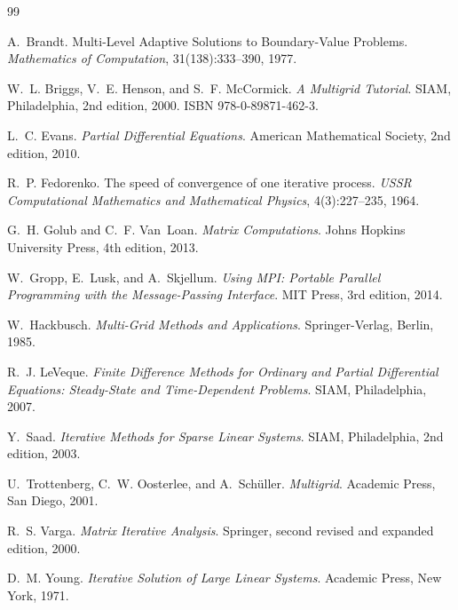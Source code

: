 \documentclass[11pt]{article}
\theoremstyle{definition}
\begin{document}
\begin{thebibliography}{99}

A.~Brandt.
\newblock Multi-Level Adaptive Solutions to Boundary-Value Problems.
\newblock \emph{Mathematics of Computation}, 31(138):333--390, 1977.

W.~L. Briggs, V.~E. Henson, and S.~F. McCormick.
\newblock \emph{A Multigrid Tutorial}.
\newblock SIAM, Philadelphia, 2nd edition, 2000.
\newblock ISBN 978-0-89871-462-3.

L.~C. Evans.
\newblock \emph{Partial Differential Equations}.
\newblock American Mathematical Society, 2nd edition, 2010.

R.~P. Fedorenko.
\newblock The speed of convergence of one iterative process.
\newblock \emph{USSR Computational Mathematics and Mathematical Physics},
  4(3):227--235, 1964.

G.~H. Golub and C.~F. Van~Loan.
\newblock \emph{Matrix Computations}.
\newblock Johns Hopkins University Press, 4th edition, 2013.

W.~Gropp, E.~Lusk, and A.~Skjellum.
\newblock \emph{Using MPI: Portable Parallel Programming with the
  Message-Passing Interface}.
\newblock MIT Press, 3rd edition, 2014.

W.~Hackbusch.
\newblock \emph{Multi-Grid Methods and Applications}.
\newblock Springer-Verlag, Berlin, 1985.

R.~J. LeVeque.
\newblock \emph{Finite Difference Methods for Ordinary and Partial
  Differential Equations: Steady-State and Time-Dependent Problems}.
\newblock SIAM, Philadelphia, 2007.

Y.~Saad.
\newblock \emph{Iterative Methods for Sparse Linear Systems}.
\newblock SIAM, Philadelphia, 2nd edition, 2003.

U.~Trottenberg, C.~W. Oosterlee, and A.~Sch{\"u}ller.
\newblock \emph{Multigrid}.
\newblock Academic Press, San Diego, 2001.

R.~S. Varga.
\newblock \emph{Matrix Iterative Analysis}.
\newblock Springer, second revised and expanded edition, 2000.

D.~M. Young.
\newblock \emph{Iterative Solution of Large Linear Systems}.
\newblock Academic Press, New York, 1971.

\end{thebibliography}
\end{document}
